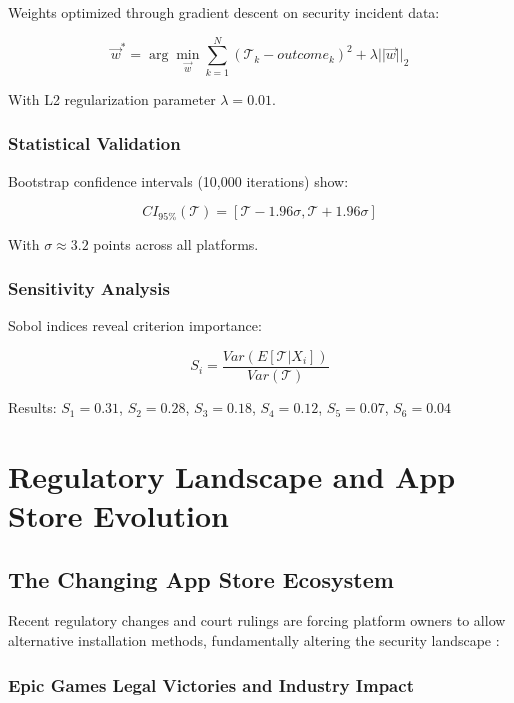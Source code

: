 \documentclass[11pt,a4paper]{article}
\begin{document}
Weights optimized through gradient descent on security incident data:

\begin{equation}
\vec{w}^* = \arg\min_{\vec{w}} \sum_{k=1}^{N} (\mathcal{T}_k - outcome_k)^2 + \lambda||\vec{w}||_2
\end{equation}

With L2 regularization parameter $\lambda = 0.01$.

\subsubsection{Statistical Validation}

Bootstrap confidence intervals (10,000 iterations) show:

\begin{equation}
CI_{95\%}(\mathcal{T}) = [\mathcal{T} - 1.96\sigma, \mathcal{T} + 1.96\sigma]
\end{equation}

With $\sigma \approx 3.2$ points across all platforms.

\subsubsection{Sensitivity Analysis}

Sobol indices reveal criterion importance:

\begin{equation}
S_i = \frac{Var(E[\mathcal{T}|X_i])}{Var(\mathcal{T})} 
\end{equation}

Results: $S_1 = 0.31$, $S_2 = 0.28$, $S_3 = 0.18$, $S_4 = 0.12$, $S_5 = 0.07$, $S_6 = 0.04$

\section{Regulatory Landscape and App Store Evolution}

\subsection{The Changing App Store Ecosystem}

Recent regulatory changes and court rulings are forcing platform owners to allow alternative installation methods, fundamentally altering the security landscape \cite{uk2024cma,india2024antitrust}:

\subsubsection{Epic Games Legal Victories and Industry Impact}
\end{document}
